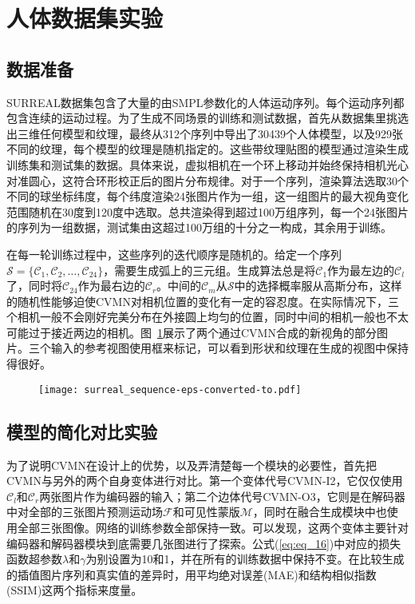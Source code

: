 \section{人体数据集实验}
\subsection{数据准备}
SURREAL\citep{varol2017}数据集包含了大量的由SMPL\citep{loper2015smpl}参数化的人体运动序列。每个运动序列都包含连续的运动过程。为了生成不同场景的训练和测试数据，首先从数据集里挑选出三维任何模型和纹理，最终从312个序列中导出了30439个人体模型，以及929张不同的纹理，每个模型的纹理是随机指定的。这些带纹理贴图的模型通过渲染生成训练集和测试集的数据。具体来说，虚拟相机在一个环上移动并始终保持相机光心对准圆心，这符合环形校正后的图片分布规律。对于一个序列，渲染算法选取30个不同的球坐标纬度，每个纬度渲染24张图片作为一组，这一组图片的最大视角变化范围随机在30度到120度中选取。总共渲染得到超过100万组序列，每一个24张图片的序列为一组数据，测试集由这超过100万组的十分之一构成，其余用于训练。

在每一轮训练过程中，这些序列的迭代顺序是随机的。给定一个序列$\mathcal{S}=\{\mathcal{C}_1, \mathcal{C}_2, \dots, \mathcal{C}_{24}\}$，需要生成弧上的三元组。生成算法总是将$\mathcal{C}_1$作为最左边的$\mathcal{C}_l$了，同时将$\mathcal{C}_{24}$作为最右边的$\mathcal{C}_r$。中间的$\mathcal{C}_m$从$\mathcal{S}$中的选择概率服从高斯分布，这样的随机性能够迫使CVMN对相机位置的变化有一定的容忍度。在实际情况下，三个相机一般不会刚好完美分布在外接圆上均匀的位置，同时中间的相机一般也不太可能过于接近两边的相机。图~\ref{fig:cvmn_surreal}展示了两个通过CVMN合成的新视角的部分图片。三个输入的参考视图使用框来标记，可以看到形状和纹理在生成的视图中保持得很好。
\begin{figure}[!htbp]
    \centering
    \texttt{[image: surreal\_sequence-eps-converted-to.pdf]}
    \label{fig:cvmn_surreal}
\end{figure}

\subsection{模型的简化对比实验}
为了说明CVMN在设计上的优势，以及弄清楚每一个模块的必要性，首先把CVMN与另外的两个自身变体进行对比。第一个变体代号CVMN-I2，它仅仅使用$\mathcal{C}_l$和$\mathcal{C}_r$两张图片作为编码器的输入；第二个边体代号CVMN-O3，它则是在解码器中对全部的三张图片预测运动场$\mathcal{F}$和可见性蒙版$\mathcal{M}$，同时在融合生成模块中也使用全部三张图像。网络的训练参数全部保持一致。可以发现，这两个变体主要针对编码器和解码器模块到底需要几张图进行了探索。公式(\ref{eq:eq_16})中对应的损失函数超参数$\lambda$和$\gamma$为别设置为10和1，并在所有的训练数据中保持不变。在比较生成的插值图片序列和真实值的差异时，用平均绝对误差(MAE)和结构相似指数(SSIM)这两个指标来度量。

